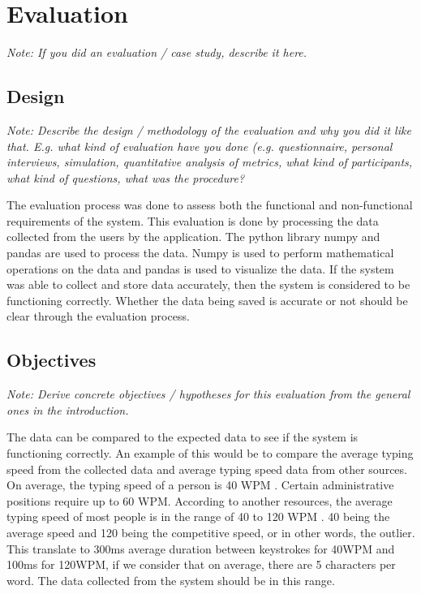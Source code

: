 \chapter{Evaluation}

\textit{Note: If you did an evaluation / case study, describe it here.}

\section{Design}

\textit{Note: Describe the design / methodology of the evaluation and why you did it like that. E.g. what kind of evaluation have you done (e.g. questionnaire, personal interviews, simulation, quantitative analysis of metrics, what kind of participants, what kind of questions, what was the procedure?}

The evaluation process was done to assess both the functional and non-functional requirements of the system.
This evaluation is done by processing the data collected from the users by the application.
The python library numpy and pandas are used to process the data.
Numpy is used to perform mathematical operations on the data and pandas is used to visualize the data.
If the system was able to collect and store data accurately, then the system is considered to be functioning correctly.
Whether the data being saved is accurate or not should be clear through the evaluation process.

\section{Objectives}

\textit{Note: Derive concrete objectives / hypotheses for this evaluation from the general ones in the introduction.}

The data can be compared to the expected data to see if the system is functioning correctly.
An example of this would be to compare the average typing speed from the collected data and average typing speed data from other sources.
On average, the typing speed of a person is 40 \ac{WPM} \cite{TypingCom2022}.
Certain administrative positions require up to 60 \ac{WPM}.
According to another resources, the average typing speed of most people is in the range of 40 to 120 WPM \cite{TypingPal}.
40 being the average speed and 120 being the competitive speed, or in other words, the outlier.
This translate to 300ms average duration between keystrokes for 40WPM and 100ms for 120WPM, if we consider that on average, there are 5 characters per word.
The data collected from the system should be in this range.

